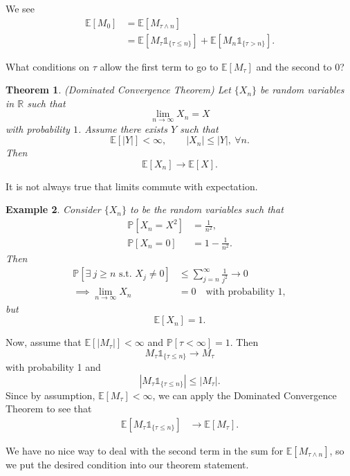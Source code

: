 \documentclass{tufte-handout}
\newcommand*\R{\mathbb{R}}
\newcommand*\E{\mathbb{E}}
\renewcommand*\P{\mathbb{P}}
\newtheorem{thm}{Theorem}[subsection]
\newtheorem{ex}[thm]{Example}
\theoremstyle{definition}
\begin{document}
We see
\begin{align*}
	\E\left[M_0\right] &= \E\left[M_{\tau \wedge n}\right] \\
	&= \E\left[M_\tau \mathds{1}_{\{\tau \le n\}}\right] + \E\left[M_n \mathds{1}_{\{\tau > n\}}\right]
.\end{align*}

What conditions on $\tau$ allow the first term to go to $\E\left[M_\tau\right] $ and the second to $0$?

\begin{thm}
	(Dominated Convergence Theorem) Let $\{X_n\}$ be random variables in $\R$ such that \[
		\lim\limits_{n \to \infty} X_n = X
	\] with probability $1$. Assume there exists $Y$ such that \[
		\E\left[\left| Y \right|\right] <\infty, \qquad \left| X_n \right| \le \left| Y \right|, \ \forall n
	.\] Then \[
		\E\left[X_n\right] \to \E\left[X\right] 
	.\] 
\end{thm}

It is not always true that limits commute with expectation. 

\begin{ex}
	Consider $\{X_n\}$ to be the random variables such that \begin{align*}
		\P\left[X_n = X^2\right] &= \frac{1}{n^2}, \\
		\P\left[X_n = 0\right] &= 1-\frac{1}{n^2}
	.\end{align*}
	Then 
	\begin{align*}
		\P\left[\exists \ j\ge n \text{ s.t. } X_j \ne 0\right] &\le \sum\limits_{j=n}^{\infty} \frac{1}{j^2} \to 0 \\
		\implies \lim\limits_{n \to \infty} X_n &=0 \quad \text{with probability 1}
	,\end{align*} but \[
		\E\left[X_n\right] = 1
	.\] 
\end{ex}

Now, assume that $\E\left[\left| M_\tau \right|\right] <\infty$ and $\P\left[\tau < \infty\right] = 1$. Then \[
	M_\tau \mathds{1}_{\{\tau \le n\}} \to M_\tau
\] with probability 1 and \[
	\left| M_\tau \mathds{1}_{\{\tau \le n\}} \right| \le \left| M_\tau \right| 
.\] Since by assumption, $\E\left[M_\tau\right] < \infty$, we can apply the Dominated Convergence Theorem to see that
\begin{align*}
	\E\left[M_\tau \mathds{1}_{\{\tau \le n\}}\right] &\to \E\left[M_\tau\right]
.\end{align*}

We have no nice way to deal with the second term in the sum for $\E\left[M_{\tau \wedge n}\right]$, so we put the desired condition into our theorem statement.
\end{document}

